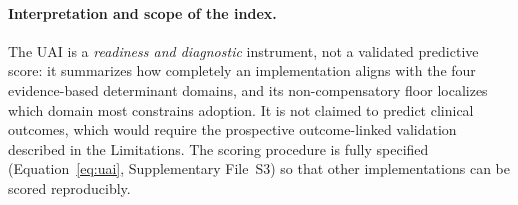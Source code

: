 \paragraph{Interpretation and scope of the index.} The UAI is a
\textit{readiness and diagnostic} instrument, not a validated predictive score:
it summarizes how completely an implementation aligns with the four evidence-based
determinant domains, and its non-compensatory floor localizes which domain most
constrains adoption. It is not claimed to predict clinical outcomes, which would
require the prospective outcome-linked validation described in the Limitations.
The scoring procedure is fully specified (Equation~\ref{eq:uai}, Supplementary
File~S3) so that other implementations can be scored reproducibly.
